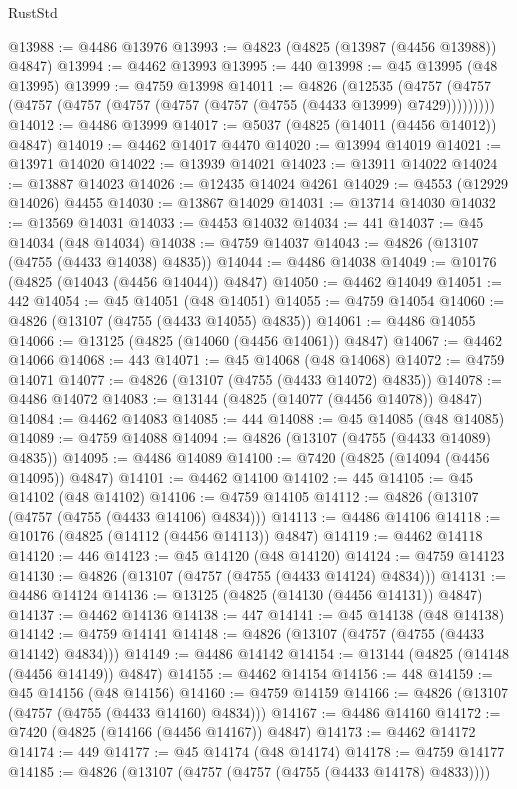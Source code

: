 \begin{lexlean}{RustStd}
\begin{coremodule}
@13988 := @4486 @13976
@13993 := @4823 (@4825 (@13987 (@4456 @13988)) @4847)
@13994 := @4462 @13993
@13995 := 440
@13998 := @45 @13995 (@48 @13995)
@13999 := @4759 @13998
@14011 := @4826
    (@12535 (@4757 (@4757 (@4757 (@4757 (@4757 (@4757 (@4757 (@4755 (@4433 @13999) @7429)))))))))
@14012 := @4486 @13999
@14017 := @5037 (@4825 (@14011 (@4456 @14012)) @4847)
@14019 := @4462 @14017 @4470
@14020 := @13994 @14019
@14021 := @13971 @14020
@14022 := @13939 @14021
@14023 := @13911 @14022
@14024 := @13887 @14023
@14026 := @12435 @14024 @4261
@14029 := @4553 (@12929 @14026) @4455
@14030 := @13867 @14029
@14031 := @13714 @14030
@14032 := @13569 @14031
@14033 := @4453 @14032
@14034 := 441
@14037 := @45 @14034 (@48 @14034)
@14038 := @4759 @14037
@14043 := @4826 (@13107 (@4755 (@4433 @14038) @4835))
@14044 := @4486 @14038
@14049 := @10176 (@4825 (@14043 (@4456 @14044)) @4847)
@14050 := @4462 @14049
@14051 := 442
@14054 := @45 @14051 (@48 @14051)
@14055 := @4759 @14054
@14060 := @4826 (@13107 (@4755 (@4433 @14055) @4835))
@14061 := @4486 @14055
@14066 := @13125 (@4825 (@14060 (@4456 @14061)) @4847)
@14067 := @4462 @14066
@14068 := 443
@14071 := @45 @14068 (@48 @14068)
@14072 := @4759 @14071
@14077 := @4826 (@13107 (@4755 (@4433 @14072) @4835))
@14078 := @4486 @14072
@14083 := @13144 (@4825 (@14077 (@4456 @14078)) @4847)
@14084 := @4462 @14083
@14085 := 444
@14088 := @45 @14085 (@48 @14085)
@14089 := @4759 @14088
@14094 := @4826 (@13107 (@4755 (@4433 @14089) @4835))
@14095 := @4486 @14089
@14100 := @7420 (@4825 (@14094 (@4456 @14095)) @4847)
@14101 := @4462 @14100
@14102 := 445
@14105 := @45 @14102 (@48 @14102)
@14106 := @4759 @14105
@14112 := @4826 (@13107 (@4757 (@4755 (@4433 @14106) @4834)))
@14113 := @4486 @14106
@14118 := @10176 (@4825 (@14112 (@4456 @14113)) @4847)
@14119 := @4462 @14118
@14120 := 446
@14123 := @45 @14120 (@48 @14120)
@14124 := @4759 @14123
@14130 := @4826 (@13107 (@4757 (@4755 (@4433 @14124) @4834)))
@14131 := @4486 @14124
@14136 := @13125 (@4825 (@14130 (@4456 @14131)) @4847)
@14137 := @4462 @14136
@14138 := 447
@14141 := @45 @14138 (@48 @14138)
@14142 := @4759 @14141
@14148 := @4826 (@13107 (@4757 (@4755 (@4433 @14142) @4834)))
@14149 := @4486 @14142
@14154 := @13144 (@4825 (@14148 (@4456 @14149)) @4847)
@14155 := @4462 @14154
@14156 := 448
@14159 := @45 @14156 (@48 @14156)
@14160 := @4759 @14159
@14166 := @4826 (@13107 (@4757 (@4755 (@4433 @14160) @4834)))
@14167 := @4486 @14160
@14172 := @7420 (@4825 (@14166 (@4456 @14167)) @4847)
@14173 := @4462 @14172
@14174 := 449
@14177 := @45 @14174 (@48 @14174)
@14178 := @4759 @14177
@14185 := @4826 (@13107 (@4757 (@4757 (@4755 (@4433 @14178) @4833))))

\end{coremodule}
\end{lexlean}
